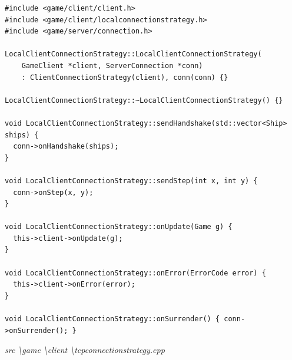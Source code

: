 \documentclass[a4paper,14pt]{extarticle}
\begin{document}
\begin{verbatim}
#include <game/client/client.h>
#include <game/client/localconnectionstrategy.h>
#include <game/server/connection.h>

LocalClientConnectionStrategy::LocalClientConnectionStrategy(
    GameClient *client, ServerConnection *conn)
    : ClientConnectionStrategy(client), conn(conn) {}

LocalClientConnectionStrategy::~LocalClientConnectionStrategy() {}

void LocalClientConnectionStrategy::sendHandshake(std::vector<Ship> ships) {
  conn->onHandshake(ships);
}

void LocalClientConnectionStrategy::sendStep(int x, int y) {
  conn->onStep(x, y);
}

void LocalClientConnectionStrategy::onUpdate(Game g) {
  this->client->onUpdate(g);
}

void LocalClientConnectionStrategy::onError(ErrorCode error) {
  this->client->onError(error);
}

void LocalClientConnectionStrategy::onSurrender() { conn->onSurrender(); }

\end{verbatim}
\textit{src \textbackslash game \textbackslash client \textbackslash tcpconnectionstrategy.cpp}
\end{document}
